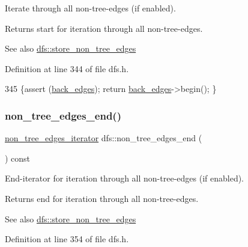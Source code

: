 Iterate through all non-\/tree-\/edges (if enabled). 

\begin{DoxyReturn}{Returns}
start for iteration through all non-\/tree-\/edges. 
\end{DoxyReturn}
\begin{DoxySeeAlso}{See also}
\mbox{\hyperlink{classdfs_a6f54f1c4339eacc8961e795439d4593d}{dfs\+::store\+\_\+non\+\_\+tree\+\_\+edges}} 
\end{DoxySeeAlso}


Definition at line 344 of file dfs.\+h.


\begin{DoxyCode}
345     \{assert (\mbox{\hyperlink{classdfs_a1dc18a7df8d6b238d5301c92fc7540fa}{back\_edges}});  \textcolor{keywordflow}{return} \mbox{\hyperlink{classdfs_a1dc18a7df8d6b238d5301c92fc7540fa}{back\_edges}}->begin(); \}
\end{DoxyCode}
\mbox{\label{classdfs_ad9cd92a18bda23edca8ab3ac60a15ef4}} 
\subsubsection{\texorpdfstring{non\+\_\+tree\+\_\+edges\+\_\+end()}{non\_tree\_edges\_end()}}
{\footnotesize\ttfamily \mbox{\hyperlink{classdfs_a95e353f354d3b31daded0c4fe749171a}{non\+\_\+tree\+\_\+edges\+\_\+iterator}} dfs\+::non\+\_\+tree\+\_\+edges\+\_\+end (\begin{DoxyParamCaption}{ }\end{DoxyParamCaption}) const\hspace{0.3cm}{\ttfamily [inline]}}



End-\/iterator for iteration through all non-\/tree-\/edges (if enabled). 

\begin{DoxyReturn}{Returns}
end for iteration through all non-\/tree-\/edges. 
\end{DoxyReturn}
\begin{DoxySeeAlso}{See also}
\mbox{\hyperlink{classdfs_a6f54f1c4339eacc8961e795439d4593d}{dfs\+::store\+\_\+non\+\_\+tree\+\_\+edges}} 
\end{DoxySeeAlso}


Definition at line 354 of file dfs.\+h.


